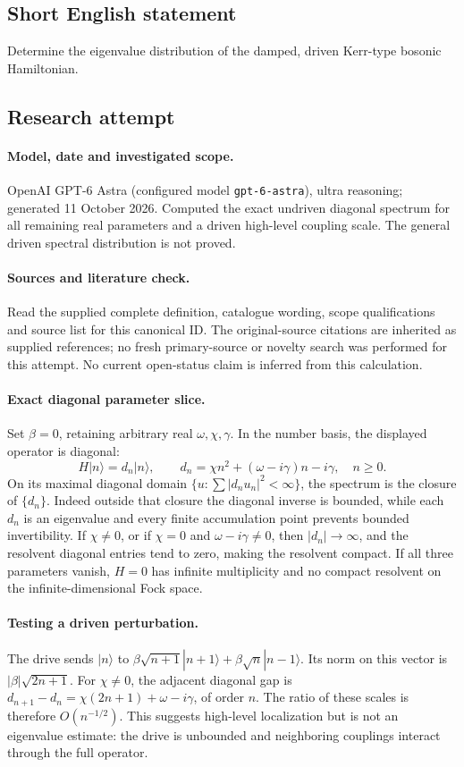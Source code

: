 \documentclass[11pt]{article}
\begin{document}
\subsection{Short English statement}
Determine the eigenvalue distribution of the damped, driven Kerr-type bosonic Hamiltonian.
\subsection{Research attempt}
\paragraph{Model, date and investigated scope.}
OpenAI GPT-6 Astra (configured model \texttt{gpt-6-astra}), ultra reasoning; generated 11 October 2026. Computed the exact undriven diagonal spectrum for all remaining real parameters and a driven high-level coupling scale. The general driven spectral distribution is not proved.

\paragraph{Sources and literature check.}
Read the supplied complete definition, catalogue wording, scope qualifications and source list for this canonical ID. The original-source citations are inherited as supplied references; no fresh primary-source or novelty search was performed for this attempt. No current open-status claim is inferred from this calculation.

\paragraph{Exact diagonal parameter slice.}Set \(\beta=0\), retaining arbitrary real \(\omega,\chi,\gamma\). In the number basis, the displayed operator is diagonal:
\[H|n\rangle=d_n|n\rangle,\qquad d_n=\chi n^2+(\omega-i\gamma)n-i\gamma,\quad n\ge0.
\]
On its maximal diagonal domain \(\{u:\sum|d_nu_n|^2<\infty\}\), the spectrum is the closure of \(\{d_n\}\). Indeed outside that closure the diagonal inverse is bounded, while each \(d_n\) is an eigenvalue and every finite accumulation point prevents bounded invertibility. If \(\chi\ne0\), or if \(\chi=0\) and \(\omega-i\gamma\ne0\), then \(|d_n|\to\infty\), and the resolvent diagonal entries tend to zero, making the resolvent compact. If all three parameters vanish, \(H=0\) has infinite multiplicity and no compact resolvent on the infinite-dimensional Fock space.
\paragraph{Testing a driven perturbation.}The drive sends \(|n\rangle\) to \(\beta\sqrt{n+1}|n+1\rangle+\beta\sqrt n|n-1\rangle\). Its norm on this vector is \(|\beta|\sqrt{2n+1}\). For \(\chi\ne0\), the adjacent diagonal gap is \(d_{n+1}-d_n=\chi(2n+1)+\omega-i\gamma\), of order \(n\). The ratio of these scales is therefore \(O(n^{-1/2})\). This suggests high-level localization but is not an eigenvalue estimate: the drive is unbounded and neighboring couplings interact through the full operator.
\end{document}
